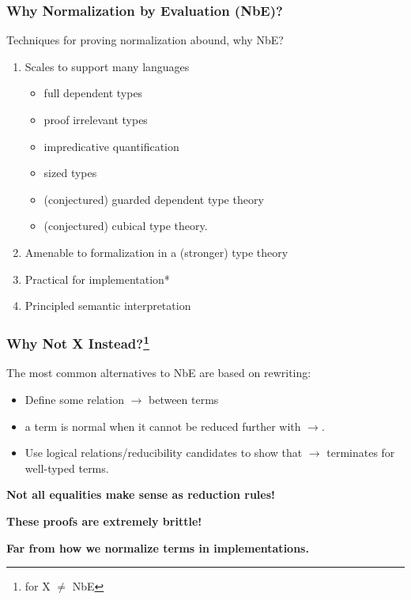 \documentclass[svgnames]{beamer}
\newcommand\fmttm[1]{{\color{Blue}#1}}
\begin{document}
\begin{frame}
  \frametitle{Why Normalization by Evaluation (NbE)?}
  Techniques for proving normalization abound, why NbE?
  \begin{enumerate}
  \item Scales to support many languages
    \begin{itemize}
    \item full dependent types
    \item proof irrelevant types
    \item impredicative quantification
    \item sized types
    \item (conjectured) guarded dependent type theory
    \item (conjectured) cubical type theory.
    \end{itemize}
  \item Amenable to formalization in a (stronger) type theory
  \item Practical for implementation*
  \item Principled semantic interpretation
  \end{enumerate}
\end{frame}

\begin{frame}
  \frametitle{Why Not X Instead?\footnote{for X $\neq$ NbE}}
  \centering
  The most common alternatives to NbE are based on rewriting:
  \begin{itemize}
  \item Define some relation $\to$ between \fmttm{terms}
  \item a \fmttm{term} is normal when it cannot be reduced further with $\to$.
  \item Use logical relations/reducibility candidates to show that $\to$ terminates for well-typed
    \fmttm{terms}.
  \end{itemize}
  \pause
  \textbf{Not all equalities make sense as reduction rules!}

  \pause
  \textbf{These proofs are extremely brittle!}

  \pause
  \textbf{Far from how we normalize terms in implementations.}
\end{frame}
\end{document}
